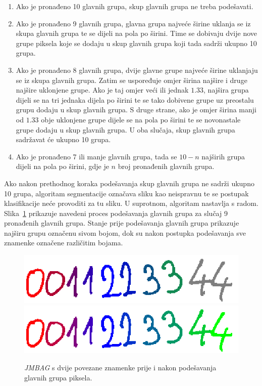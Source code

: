 \begin{enumerate}
    \item Ako je pronađeno 10 glavnih grupa, skup glavnih grupa ne treba podešavati.
    \item Ako je pronađeno 9 glavnih grupa, glavna grupa najveće širine uklanja se iz skupa glavnih grupa te se dijeli
    na pola po širini. Time se dobivaju dvije nove grupe piksela koje se dodaju u skup glavnih grupa koji tada sadrži
    ukupno 10 grupa.
    \item Ako je pronađeno 8 glavnih grupa, dvije glavne grupe najveće širine uklanjaju se iz skupa glavnih grupa.
    Zatim se uspoređuje omjer širina najšire i druge najšire uklonjene grupe. Ako je taj omjer veći ili jednak $1.33$,
    najšira grupa dijeli se na tri jednaka dijela po širini te se tako dobivene grupe uz preostalu grupu dodaju u skup
    glavnih grupa. S druge strane, ako je omjer širina manji od $1.33$ obje uklonjene grupe dijele se na pola po širini
    te se novonastale grupe dodaju u skup glavnih grupa. U oba slučaja, skup glavnih grupa sadržavat će ukupno 10 grupa.
    \item Ako je pronađeno 7 ili manje glavnih grupa, tada se $10 - n$ najširih grupa dijeli na pola po širini, gdje je
    $n$ broj pronađenih glavnih grupa.
\end{enumerate}
Ako nakon prethodnog koraka podešavanja skup glavnih grupa ne sadrži ukupno 10 grupa, algoritam segmentacije označava
sliku kao neispravnu te se postupak klasifikacije neće provoditi za tu sliku. U suprotnom, algoritam nastavlja s radom.
Slika\ \ref{fig:segmentation-division} prikazuje navedeni proces podešavanja glavnih grupa za slučaj 9 pronađenih glavnih
grupa. Stanje prije podešavanja glavnih grupa prikazuje najširu grupu označenu sivom bojom, dok su nakon postupka
podešavanja sve znamenke označene različitim bojama.\\
\begin{figure}[htb]
    \centering
    \includegraphics[width=12cm]{images/segmentation-before-division.png}
    \includegraphics[width=12cm]{images/segmentation-after-division.png}
    \caption{\emph{JMBAG} s dvije povezane znamenke prije i nakon podešavanja glavnih grupa piksela.}
    \label{fig:segmentation-division}
\end{figure}
